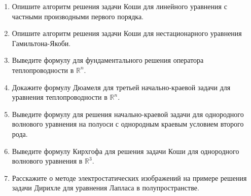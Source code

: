 %
%

\begin{enumerate}

\item  Опишите алгоритм решения задачи Коши для линейного уравнения с частными производными первого порядка. 

\item Опишите алгоритм решения задачи Коши для нестационарного уравнения Гамильтона-Якоби.

\item Выведите формулу для фундаментального решения оператора теплопроводности в $\mathbb{R}^n$.

\item Докажите формулу Дюамеля для третьей начально-краевой задачи для уравнения теплопроводности в $\mathbb{R}^n$.

\item Выведите формулу для решения начально-краевой задачи для однородного волнового уравнения на полуоси с однородным краевым условием второго рода.

\item Выведите формулу Кирхгофа для решения задачи Коши для однородного волнового уравнения в $\mathbb{R}^3$.

\item Расскажите о методе электростатических изображений на примере решения задачи Дирихле для уравнения Лапласа в полупространстве.

\end{enumerate}




